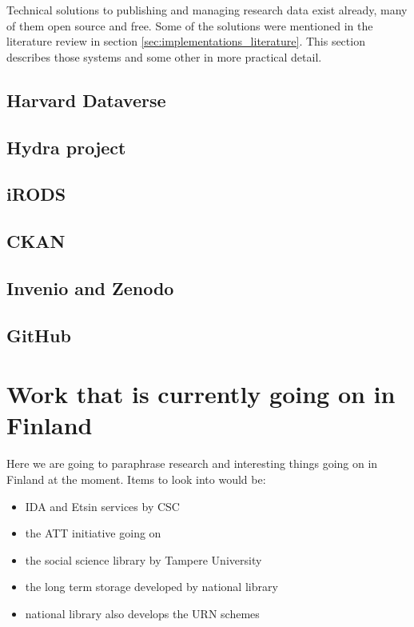 Technical solutions to publishing and managing research data exist already, many
of them open source and free. Some of the solutions were mentioned in the
literature review in section \ref{sec:implementations_literature}. This section describes
those systems and some other in more practical detail.

\subsection{Harvard Dataverse}

\subsection{Hydra project}

\subsection{iRODS}

\subsection{CKAN}

\subsection{Invenio and Zenodo}

\subsection{GitHub}

\section{Work that is currently going on in Finland}
\label{sec:finland_current}

Here we are going to paraphrase research and interesting things going on in
Finland at the moment. Items to look into would be:

\begin{itemize}
    \item IDA and Etsin services by CSC
    \item the ATT initiative going on
    \item the social science library by Tampere University
    \item the long term storage developed by national library
    \item national library also develops the URN schemes
\end{itemize}

